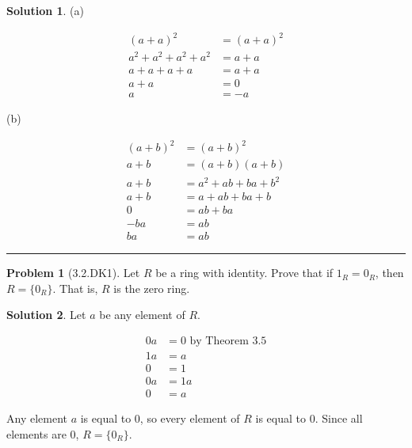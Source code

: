 \documentclass[12pt]{article}
\theoremstyle{definition}
\newtheorem*{prob}{Problem}
\newtheorem*{soln}{Solution}
\newcommand{\hr}{\vspace*{\parskip}\hrule}
\begin{document}
\begin{soln}

(a)

\begin{align*}
(a+a)^2&=(a+a)^2\\
a^2+a^2+a^2+a^2&=a+a\\
a+a+a+a&=a+a\\
a+a&=0\\
a&=-a
\end{align*}

(b)

\begin{align*}
(a+b)^2&=(a+b)^2\\
a+b&= (a+b)(a+b)\\
a+b&=a^2+ab+ba+b^2\\
a+b&=a+ab+ba+b\\
0&=ab+ba\\
-ba&=ab\\
ba&=ab
\end{align*}

\end{soln}

\hr

\begin{prob}[3.2.DK1]
Let $R$ be a ring with identity. Prove that if $1_R=0_R$, then
$R = \{ 0_R \}$. That is, $R$ is the zero ring.
\end{prob}

\begin{soln}

Let $a$ be any element of $R$.

\begin{align*}
0a&=0\text{ by Theorem 3.5}\\
1a&=a\\
0&=1\\
0a&=1a\\
0&=a
\end{align*}

Any element $a$ is equal to $0$,
so every element of $R$ is equal to $0$.
Since all elements are $0$, $R=\{0_R\}$.

\end{soln}
\end{document}
